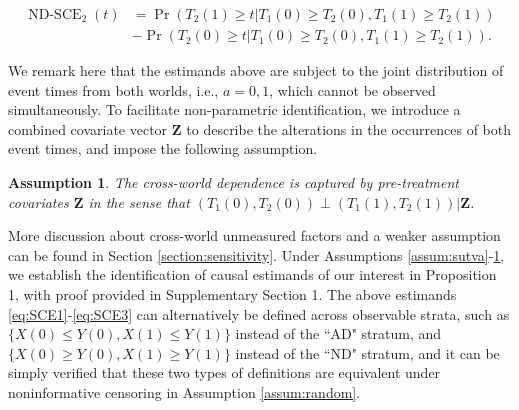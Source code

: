 \documentclass[useAMS,usenatbib,referee]{biom}
\theoremstyle{plain}
\newtheorem{assum}{Assumption}
\def\bfZ{\mathbf{Z}}
\def\Pr{\operatorname{Pr}}
\begin{document}
\begin{equation}
\begin{split}
\operatorname{ND-SCE}_2(t)
&=\Pr(T_2(1)\geq t|T_1(0)\geq T_2(0),T_1(1)\geq T_2(1))\\
&-\Pr(T_2(0)\geq t|T_1(0)\geq T_2(0),T_1(1)\geq T_2(1)).
\label{eq:SCE3}
\end{split}
\end{equation}


We remark here that the estimands above are subject to the joint distribution of event times from both worlds, i.e., $a=0,1$, which cannot be observed simultaneously. To facilitate non-parametric identification, we introduce a combined covariate vector $\bfZ$ to describe the alterations in the occurrences of both event times, and impose the following assumption. 
\begin{assum}
The cross-world dependence is captured by pre-treatment covariates $\bfZ$ in the sense that $(T_1(0),T_2(0))\perp (T_1(1),T_2(1))|\bfZ$.
\label{assum: covariate}
\end{assum}

More discussion about cross-world unmeasured factors and a weaker assumption can be found in Section \ref{section:sensitivity}. Under Assumptions \ref{assum:sutva}-\ref{assum: covariate}, we establish the identification of causal estimands of our interest in Proposition 1, with proof provided in Supplementary Section 1. The above estimands \eqref{eq:SCE1}-\eqref{eq:SCE3} can alternatively be defined across observable strata, such as $\{X(0) \leq Y(0), X(1) \leq Y(1)\}$ instead of the ``AD" stratum, and $\{X(0) \geq Y(0), X(1) \geq Y(1)\}$ instead of the ``ND" stratum, and it can be simply verified that these two types of definitions are equivalent under noninformative censoring in Assumption \ref{assum:random}.
\end{document}
